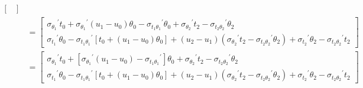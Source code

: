 \documentclass{article}
\begin{document}
\begin{align*}
\begin{bmatrix}
            \end{bmatrix}
            \\
            &=
            \begin{bmatrix}
                {\sigma_{\theta_1}}^{'}t_0
                + {\sigma_{\theta_1}}^{'}(u_1-u_0)\theta_0
                - {\sigma_{t_1\theta_1}}^{'}\theta_0
                + {\sigma_{\theta_2}}^{'} t_2
                - {\sigma_{t_2\theta_2}}^{'}\theta_2
                \\
                {\sigma_{t_1}}^{'}\theta_0
                - {\sigma_{t_1\theta_1}}^{'}\left[ t_0 + (u_1-u_0)\theta_0 \right]
                + \left(u_2-u_1\right)\left({\sigma_{\theta_2}}^{'} t_2
                - {\sigma_{t_2\theta_2}}^{'}\theta_2\right)
                + {\sigma_{t_2}}^{'}\theta_2
                - {\sigma_{t_2\theta_2}}^{'}t_2
            \end{bmatrix}
            \\
            &=
            \begin{bmatrix}
                {\sigma_{\theta_1}}^{'}t_0
                + \left[ {\sigma_{\theta_1}}^{'}(u_1-u_0) - {\sigma_{t_1\theta_1}}^{'}\right]\theta_0
                + {\sigma_{\theta_2}}^{'} t_2
                - {\sigma_{t_2\theta_2}}^{'}\theta_2
                \\
                {\sigma_{t_1}}^{'}\theta_0
                - {\sigma_{t_1\theta_1}}^{'}\left[ t_0 + (u_1-u_0)\theta_0 \right]
                + \left(u_2-u_1\right)\left({\sigma_{\theta_2}}^{'} t_2
                - {\sigma_{t_2\theta_2}}^{'}\theta_2\right)
                + {\sigma_{t_2}}^{'}\theta_2
                - {\sigma_{t_2\theta_2}}^{'}t_2
            \end{bmatrix}
        \end{align*}
\end{document}
